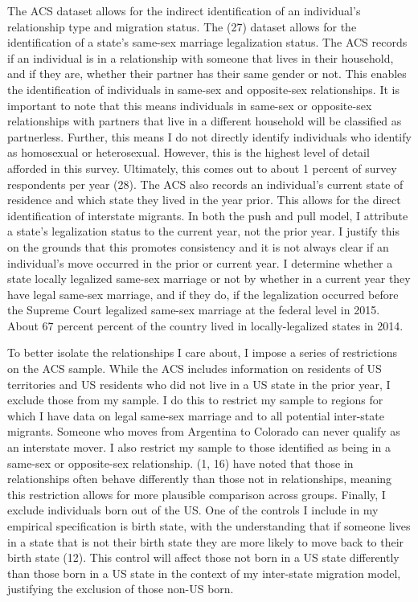 \documentclass[12pt,letterpaper]{article}
\begin{document}


The ACS dataset allows for the indirect identification of an individual’s relationship type and migration status. The (27) dataset allows for the identification of a state’s same-sex marriage legalization status. The ACS records if an individual is in a relationship with someone that lives in their household, and if they are, whether their partner has their same gender or not. This enables the identification of individuals in same-sex and opposite-sex relationships. It is important to note that this means individuals in same-sex or opposite-sex relationships with partners that live in a different household will be classified as partnerless. Further, this means I do not directly identify individuals who identify as homosexual or heterosexual. However, this is the highest level of detail afforded in this survey. Ultimately, this comes out to about 1 percent of survey respondents per year (28). The ACS also records an individual’s current state of residence and which state they lived in the year prior. This allows for the direct identification of interstate migrants. In both the push and pull model, I attribute a state’s legalization status to the current year, not the prior year. I justify this on the grounds that this promotes consistency and it is not always clear if an individual’s move occurred in the prior or current year. I determine whether a state locally legalized same-sex marriage or not by whether in a current year they have legal same-sex marriage, and if they do, if the legalization occurred before the Supreme Court legalized same-sex marriage at the federal level in 2015. About 67 percent percent of the country lived in locally-legalized states in 2014. 



To better isolate the relationships I care about, I impose a series of restrictions on the ACS sample. While the ACS includes information on residents of US territories and US residents who did not live in a US state in the prior year, I exclude those from my sample. I do this to restrict my sample to regions for which I have data on legal same-sex marriage and to all potential inter-state migrants. Someone who moves from Argentina to Colorado can never qualify as an interstate mover. I also restrict my sample to those identified as being in a same-sex or opposite-sex relationship. (1, 16) have noted that those in relationships often behave differently than those not in relationships, meaning this restriction allows for more plausible comparison across groups. Finally, I exclude individuals born out of the US. One of the controls I include in my empirical specification is birth state, with the understanding that if someone lives in a state that is not their birth state they are more likely to move back to their birth state (12). This control will affect those not born in a US state differently than those born in a US state in the context of my inter-state migration model, justifying the exclusion of those non-US born.
\end{document}
